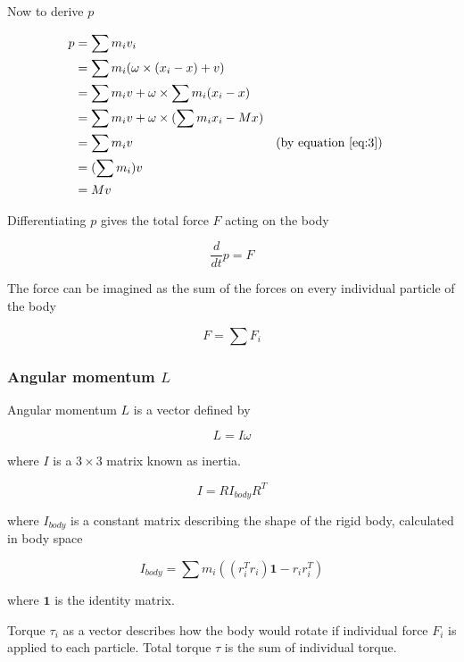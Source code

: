 \documentclass[12pt,a4paper,twoside,openright]{report}
\begin{document}
Now to derive $p$

\begin{align*} 
    p &= \sum m_i v_i \\
      &= \sum m_i (\omega \times (x_i - x) + v) \\
      &= \sum m_i v + \omega \times \sum m_i (x_i - x) \\
      &= \sum m_i v + \omega \times (\sum m_i x_i - M x) \\
      &= \sum m_i v && \text{(by equation \eqref{eq:3})} \\
      &= (\sum m_i) v \\
      &= M v
\end{align*} 

Differentiating $p$ gives the total force $F$ acting on the body

\begin{equation}
\frac{d}{dt} p = F
\end{equation}

The force can be imagined as the sum of the forces on every individual particle of the body

\begin{equation}
F = \sum F_i
\end{equation}

\subsubsection{Angular momentum $L$} 

Angular momentum $L$ is a vector defined by

\begin{equation}
L = I \omega
\end{equation}

where $I$ is a $3\times 3$ matrix known as inertia.

\begin{equation}
I = R I_{body} R^T
\end{equation}

where $I_{body}$ is a constant matrix describing the shape of the rigid body, calculated in body space
    
\begin{equation}
I_{body} = \sum m_i((r_i^T r_i)\textbf{1} - r_i r_i^T)
\end{equation}

where $\textbf{1}$ is the identity matrix.

Torque $\tau_i$ as a vector describes how the body would rotate if individual force $F_i$ is applied to each particle. Total torque $\tau$ is the sum of individual torque.
\end{document}
